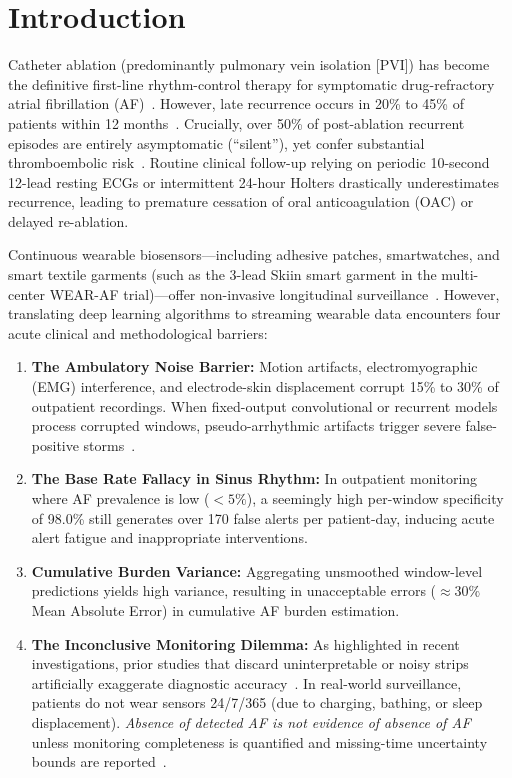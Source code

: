 \documentclass[10pt,twocolumn,letterpaper]{article}
\begin{document}
\section{Introduction}
Catheter ablation (predominantly pulmonary vein isolation [PVI]) has become the definitive first-line rhythm-control therapy for symptomatic drug-refractory atrial fibrillation (AF)~\cite{hindricks2021esc}. However, late recurrence occurs in 20\% to 45\% of patients within 12 months~\cite{marrouche2018catheter}. Crucially, over 50\% of post-ablation recurrent episodes are entirely asymptomatic (``silent''), yet confer substantial thromboembolic risk~\cite{verma2013incidence}. Routine clinical follow-up relying on periodic 10-second 12-lead resting ECGs or intermittent 24-hour Holters drastically underestimates recurrence, leading to premature cessation of oral anticoagulation (OAC) or delayed re-ablation.

Continuous wearable biosensors—including adhesive patches, smartwatches, and smart textile garments (such as the 3-lead Skiin smart garment in the multi-center WEAR-AF trial)—offer non-invasive longitudinal surveillance~\cite{cheung2023wearable}. However, translating deep learning algorithms to streaming wearable data encounters four acute clinical and methodological barriers:
\begin{enumerate}
    \item \textbf{The Ambulatory Noise Barrier:} Motion artifacts, electromyographic (EMG) interference, and electrode-skin displacement corrupt 15\% to 30\% of outpatient recordings. When fixed-output convolutional or recurrent models process corrupted windows, pseudo-arrhythmic artifacts trigger severe false-positive storms~\cite{fleury2026noise}.
    \item \textbf{The Base Rate Fallacy in Sinus Rhythm:} In outpatient monitoring where AF prevalence is low ($<5\%$), a seemingly high per-window specificity of 98.0\% still generates over 170 false alerts per patient-day, inducing acute alert fatigue and inappropriate interventions.
    \item \textbf{Cumulative Burden Variance:} Aggregating unsmoothed window-level predictions yields high variance, resulting in unacceptable errors ($\approx 30\%$ Mean Absolute Error) in cumulative AF burden estimation.
    \item \textbf{The Inconclusive Monitoring Dilemma:} As highlighted in recent investigations, prior studies that discard uninterpretable or noisy strips artificially exaggerate diagnostic accuracy~\cite{behar2013ecg, afa_arc_2026}. In real-world surveillance, patients do not wear sensors 24/7/365 (due to charging, bathing, or sleep displacement). \emph{Absence of detected AF is not evidence of absence of AF} unless monitoring completeness is quantified and missing-time uncertainty bounds are reported~\cite{afa_arc_2026}.
\end{enumerate}
\end{document}
